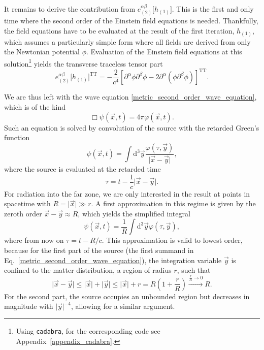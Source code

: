 It remains to derive the contribution from $e^{\alpha\beta}_{(2)}\lbrack h_{(1)}\rbrack$. This is the first and only time where the second order of the Einstein field equations is needed. Thankfully, the field equations have to be evaluated at the result of the first iteration, $h_{(1)}$, which assumes a particularly simple form where all fields are derived from only the Newtonian potential $\phi$. Evaluation of the Einstein field equations at this solution\footnote{Using \texttt{cadabra}, for the corresponding code see Appendix~\ref{appendix_cadabra}.} yields the transverse traceless tensor part
\begin{equation}
  e^{\alpha\beta}_{(2)}\lbrack h_{(1)}\rbrack^\text{TT} = -\frac{2}{c^4}\left\lbrack\partial^\alpha\phi\partial^\beta\phi - 2\partial^\alpha(\phi\partial^\beta\phi) \right\rbrack^\text{TT}.
\end{equation}

We are thus left with the wave equation \eqref{metric_second_order_wave_equation}, which is of the kind
\begin{equation}
  \Box\psi(\vec x,t) = 4\pi\varphi(\vec x,t).
\end{equation}
Such an equation is solved by convolution of the source with the retarded Green's function\cite{}
\begin{equation}
  \psi(\vec x,t) = \int\mathrm d^3\vec y\frac{\varphi(\tau,\vec y)}{\lvert\vec x-\vec y\rvert},
\end{equation}
where the source is evaluated at the retarded time
\begin{equation}
  \tau = t - \frac{1}{c}\lvert\vec x-\vec y\rvert.
\end{equation}
For radiation into the far zone, we are only interested in the result at points in spacetime with $R=\lvert\vec x\rvert\gg r$. A first approximation in this regime is given by the zeroth order $\vec x - \vec y \approx R$, which yields the simplified integral
\begin{equation}
  \psi(\vec x,t) = \frac{1}{R}\int\mathrm d^3\vec y\varphi(\tau,\vec y),
\end{equation}
where from now on $\tau = t-R/c$. This approximation is valid to lowest order, because for the first part of the source (the first summand in Eq.~\eqref{metric_second_order_wave_equation}), the integration variable $\vec y$ is confined to the matter distribution, a region of radius $r$, such that
\begin{equation}
  \lvert\vec x-\vec y\rvert \leq \lvert\vec x\rvert + \lvert\vec y\rvert \leq \lvert\vec x\rvert + r = R(1 + \frac{r}{R}) \xrightarrow{\frac{r}{R}\to 0} R.
\end{equation}
For the second part, the source occupies an unbounded region but decreases in magnitude with $\lvert\vec y\rvert^{-4}$, allowing for a similar argument.


